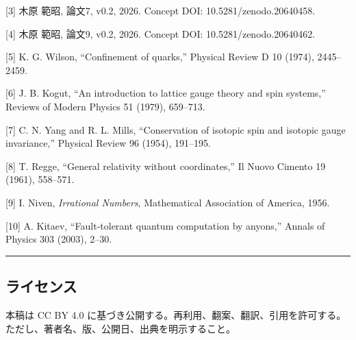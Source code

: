\documentclass[
]{ltjsarticle}
\begin{document}
{[}3{]} 木原 範昭, 論文7, v0.2, 2026. Concept DOI:
10.5281/zenodo.20640458.

{[}4{]} 木原 範昭, 論文9, v0.2, 2026. Concept DOI:
10.5281/zenodo.20640462.

{[}5{]} K. G. Wilson, ``Confinement of quarks,'' Physical Review D 10
(1974), 2445--2459.

{[}6{]} J. B. Kogut, ``An introduction to lattice gauge theory and spin
systems,'' Reviews of Modern Physics 51 (1979), 659--713.

{[}7{]} C. N. Yang and R. L. Mills, ``Conservation of isotopic spin and
isotopic gauge invariance,'' Physical Review 96 (1954), 191--195.

{[}8{]} T. Regge, ``General relativity without coordinates,'' Il Nuovo
Cimento 19 (1961), 558--571.

{[}9{]} I. Niven, \emph{Irrational Numbers}, Mathematical Association of
America, 1956.

{[}10{]} A. Kitaev, ``Fault-tolerant quantum computation by anyons,''
Annals of Physics 303 (2003), 2--30.

\begin{center}\rule{0.5\linewidth}{0.5pt}\end{center}

\subsection{ライセンス}\label{ux30e9ux30a4ux30bbux30f3ux30b9}

本稿は CC BY 4.0
に基づき公開する。再利用、翻案、翻訳、引用を許可する。ただし、著者名、版、公開日、出典を明示すること。
\end{document}
